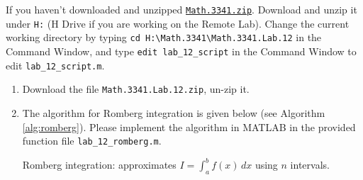If you haven't downloaded and unzipped \href{https://libaoj.in/courses/2021f/MATH3341/zip/Math.3341.zip}{\texttt{Math.3341.zip}}. Download and unzip it under \verb|H:| (H Drive if you are working on the Remote Lab). Change the current working directory by typing \verb|cd H:\Math.3341\Math.3341.Lab.12| in the Command Window, and type \verb|edit lab_12_script| in the Command Window to edit \verb|lab_12_script.m|.

\begin{enumerate}[1.]
    \item Download the file \verb`Math.3341.Lab.12.zip`, un-zip it.
    \item The algorithm for Romberg integration is given below (see Algorithm \ref{alg:romberg}). Please implement the algorithm in MATLAB in the provided function file \verb|lab_12_romberg.m|.
        \quad \\
        \begin{minipage}{\linewidth}
        \begin{algorithm}[H]
            \caption{Romberg integration: approximates $I = \int_{a}^{b} f(x) \, dx$ using $n$ intervals.}
            \label{alg:romberg}
            \SetAlgoLined
        \end{algorithm}
        \end{minipage}


\end{enumerate}

